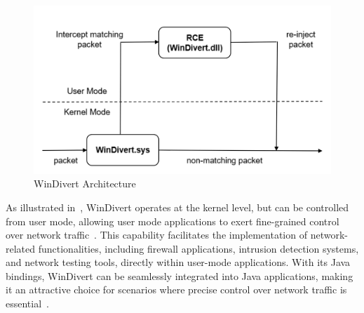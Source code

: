 \begin{figure}
    \centering
    \includegraphics[width=\linewidth]{files/figures/WinDivert.png}
    \caption{WinDivert Architecture}
    \label{fig:WinDivert}
\end{figure}

As illustrated in~, WinDivert operates at the kernel level, but can be controlled from user mode, allowing user mode applications to exert fine-grained control over network traffic~\cite{noauthor_windivert:_nodate}. This capability facilitates the implementation of network-related functionalities, including firewall applications, intrusion detection systems, and network testing tools, directly within user-mode applications. With its Java bindings, WinDivert can be seamlessly integrated into Java applications, making it an attractive choice for scenarios where precise control over network traffic is essential~\cite{noauthor_windivert:_nodate}.
